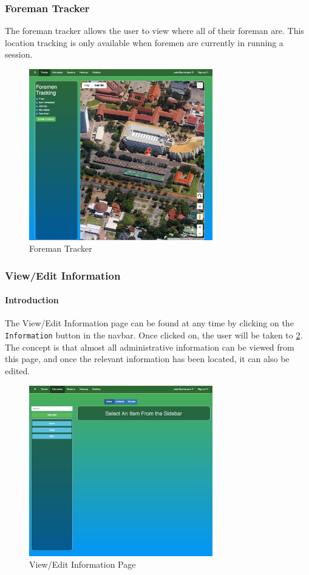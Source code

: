 \documentclass[11pt]{article}
\begin{document}
\subsubsection{Foreman Tracker}
\label{webTracker}
The foreman tracker allows the user to view where all of their foreman are. This location tracking is only available when foremen are currently in running a session.

\begin{figure}
 \centering
 \includegraphics[width=8cm, keepaspectratio]{Images/UsingSystem/WebTracker.png}
 \caption{Foreman Tracker}
 \label{ForemanTracker}
\end{figure}

\subsubsection{View/Edit Information}
\label{webInformation}
\paragraph{Introduction}The View/Edit Information page can be found at any time by clicking on the \texttt{Information} button in the navbar. Once clicked on, the user will be taken to \ref{InformationPage}. The concept is that almost all administrative information can be viewed from this page, and once the relevant information has been located, it can also be edited.

\begin{figure}
 \centering
 \includegraphics[width=8cm, keepaspectratio]{Images/UsingSystem/WebInfo.png}
 \caption{View/Edit Information Page}
 \label{InformationPage}
\end{figure}
\end{document}
